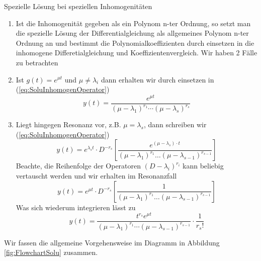 \begin{note}{Spezielle Lösung bei speziellen Inhomogenitäten}
  \begin{enumerate}
    \item Ist die Inhomogenität gegeben als ein Polynom n-ter Ordnung, so setzt
      man die spezielle Lösung der Differentialgleichung als allgemeines
      Polynom n-ter Ordnung an und bestimmt die Polynomialkoeffizienten durch
      einsetzen in die inhomogene Differetialgleichung und
      Koeffizientenvergleich.  Wir haben 2 Fälle zu betrachten
    \item Ist $g(t)=e^{\mu t}$ und $\mu\ne\lambda_i$ dann erhalten wir durch
      einsetzen in (\ref{eq:SoluInhomogenOperator}) 
  \[ y(t)=\frac{e^{\mu t}}{(\mu-\lambda_1)^{r_1}
            \cdots(\mu-\lambda_s)^{r_s}}\]
	  \item Liegt hingegen Resonanz vor, z.B.  $\mu=\lambda_s$, dann schreiben wir (\ref{eq:SoluInhomogenOperator})
	    \[y(t)=e^{\lambda_s t}\cdot D^{-r_s}
	    \left[\frac{e^{(\mu-\lambda_s)\cdot t}}{(\mu-\lambda_1)^{r_1}\dots(\mu-\lambda_{s-1})^{r_{s-1}}}\right]\]
	    Beachte, die Reihenfolge der Operatoren $(D-\lambda_i)^{r_i}$
	    kann beliebig vertauscht werden und wir erhalten im Resonanzfall
	    \[y(t)=e^{\mu t}\cdot D^{-r_s}
	      \left[\frac{1}{(\mu-\lambda_1)^{r_1}\dots(\mu-\lambda_{s-1})^{r_{s-1}}}\right]\]
	    Was sich wiederum integrieren lässt zu
	\[ y(t)=\frac{t^{r_s}e^{\mu t}}{(\mu-\lambda_1)^{r_1} \cdots(\mu-\lambda_{s-1})^{r_{s-1}}}
	\cdot\frac{1}{r_s!}\]
  \end{enumerate}
\end{note}
Wir fassen die allgemeine Vorgehensweise im Diagramm in Abbildung
\ref{fig:FlowchartSolu} zusammen.
%
